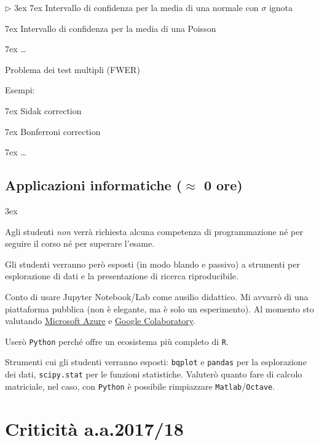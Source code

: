 \documentclass[10pt]{article}
\newcommand{\mylabel}[1]{#1\hfill}
\renewenvironment{itemize}
  {\begin{list}{$\triangleright$}{%
   \baselineskip3ex
   \setlength{\parskip}{4mm}
   \setlength{\topsep}{.4\baselineskip}
   \setlength{\rightmargin}{0mm}
   \setlength{\listparindent}{0mm}
   \setlength{\itemindent}{0mm}
   \setlength{\labelwidth}{2ex}
   \setlength{\itemsep}{.4\baselineskip}
   \setlength{\parsep}{0mm}
   \setlength{\partopsep}{0mm}
   \setlength{\labelsep}{1ex}
   \setlength{\leftmargin}{\labelwidth+\labelsep}
   \let\makelabel\mylabel}}{%
   \end{list}\vspace*{-1.3mm}}
\begin{document}
\begin{itemize}
  \noindent\kern7ex Intervallo di confidenza per la media di una normale con $\sigma$ ignota
  
  \noindent\kern7ex Intervallo di confidenza per la media di una Poisson

  \noindent\kern7ex \ldots\hfill{} 
  
  
\item Problema dei test multipli (FWER)\hfill{} 

Esempi:
  
  \noindent\kern7ex Sidak correction

  \noindent\kern7ex Bonferroni correction
  
  \noindent\kern7ex \ldots\hfill{} 

\end{itemize}


\clearpage
\subsection{Applicazioni informatiche (\boldmath$\approx$ 0 ore)}
\baselineskip3ex

Agli studenti \textit{non\/} verrà richiesta alcuna competenza di programmazione né per seguire il corso né per superare l'esame. 

Gli studenti verranno però esposti (in modo blando e passivo) a strumenti per esplorazione di dati e la presentazione di ricerca riproducibile.

Conto di usare Jupyter Notebook/Lab come ausilio didattico. Mi avvarrò di una piattaforma pubblica (non è elegante, ma è solo un esperimento). Al momento sto valutando \href{https://notebooks.azure.com/help/jupyter-notebooks}{Microsoft Azure} e \href{https://colab.research.google.com}{Google Colaboratory}.

Userò {\tt Python\/} perché offre un ecosistema più completo di {\tt R}.

Strumenti cui gli studenti verranno esposti: {\tt bqplot} e {\tt pandas} per la esplorazione dei dati, {\tt scipy.stat} per le funzioni statistiche. Valuterò quanto fare di calcolo matriciale, nel caso, con {\tt Python} è possibile rimpiazzare {\tt Matlab}/{\tt Octave}.


\clearpage
\section{Criticità a.a.\@ 2017/18}
\end{document}
